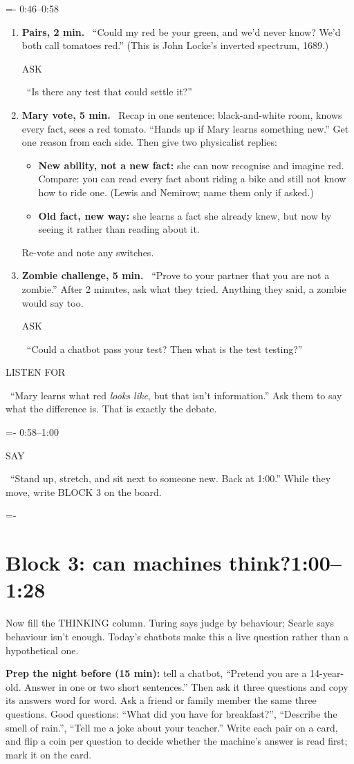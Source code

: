 \documentclass[11pt,letterpaper]{article}
\makeatletter
\newcommand{\keep}[1]{\par\penalty\z@\begingroup\dimen@=#1\relax\dimen@ii=\pagegoal\advance\dimen@ii-\pagetotal
  \ifdim\dimen@>\dimen@ii\ifdim\dimen@ii>\z@\vfil\break\fi\fi\endgroup}
\newcommand{\block}[2]{\keep{6\baselineskip}\section[#1]{#1\hfill{\normalsize\mdseries\color{muted}#2}}}
\newcommand{\beat}[2]{\keep{3\baselineskip}\vspace{5pt}\noindent{\sffamily\bfseries #1}\hfill{\sffamily\small\color{muted}#2}\par\nopagebreak\vspace{1pt}}
\newcommand{\tagbox}[1]{\colorbox{tagbg}{\sffamily\scriptsize\bfseries\color{accent}\strut #1}}
\newcommand{\say}{\tagbox{SAY}\ }
\newcommand{\ask}{\tagbox{ASK}\ }
\newcommand{\listen}{\tagbox{LISTEN FOR}\ }
\newcommand{\dur}[1]{\textsf{\bfseries\small #1.}\ }
\makeatother
\begin{document}
\beat{Discussion}{0:46--0:58}
\begin{enumerate}
\item \dur{Pairs, 2 min} ``Could my red be your green, and we'd never know? We'd both call tomatoes red.'' (This is John Locke's inverted spectrum, 1689.) \ask ``Is there any test that could settle it?''
\item \dur{Mary vote, 5 min} Recap in one sentence: black-and-white room, knows every fact, sees a red tomato. ``Hands up if Mary learns something new.'' Get one reason from each side. Then give two physicalist replies:
  \begin{itemize}
  \item \textbf{New ability, not a new fact:} she can now recognise and imagine red. Compare: you can read every fact about riding a bike and still not know how to ride one. (Lewis and Nemirow; name them only if asked.)
  \item \textbf{Old fact, new way:} she learns a fact she already knew, but now by seeing it rather than reading about it.
  \end{itemize}
  Re-vote and note any switches.
\item \dur{Zombie challenge, 5 min} ``Prove to your partner that you are not a zombie.'' After 2 minutes, ask what they tried. Anything they said, a zombie would say too. \ask ``Could a chatbot pass your test? Then what is the test testing?''
\end{enumerate}
\listen ``Mary learns what red \emph{looks like}, but that isn't information.'' Ask them to say what the difference is. That is exactly the debate.

\beat{Break}{0:58--1:00}
\say ``Stand up, stretch, and sit next to someone new. Back at 1:00.'' While they move, write BLOCK 3 on the board.

\block{Block 3: can machines think?}{1:00--1:28}

Now fill the THINKING column. Turing says judge by behaviour; Searle says behaviour isn't enough. Today's chatbots make this a live question rather than a hypothetical one.

\textsf{\bfseries Prep the night before (15 min):} tell a chatbot, ``Pretend you are a 14-year-old. Answer in one or two short sentences.'' Then ask it three questions and copy its answers word for word. Ask a friend or family member the same three questions. Good questions: ``What did you have for breakfast?'', ``Describe the smell of rain.'', ``Tell me a joke about your teacher.'' Write each pair on a card, and flip a coin per question to decide whether the machine's answer is read first; mark it on the card.
\end{document}
